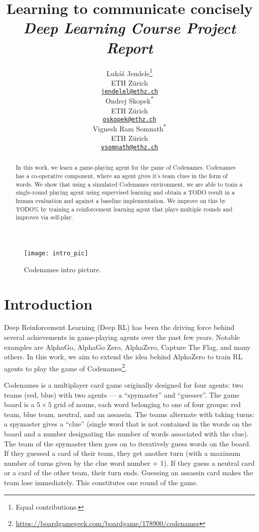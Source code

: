 \documentclass{article}
\title{Learning to communicate concisely\\{\large \textit{Deep Learning Course Project Report}}}
\author{
  Luk\'{a}\v{s} Jendele\thanks{Equal contributions.}\\
  ETH Z\"{u}rich\\
  \href{mailto:jendelel@ethz.ch}{\texttt{jendelel@ethz.ch}}\\
  \And
  Ondrej Skopek\textsuperscript{$\ast$}\\
  ETH Z\"{u}rich\\
  \href{mailto:oskopek@ethz.ch}{\texttt{oskopek@ethz.ch}}\\
  \And
  Vignesh Ram Somnath\textsuperscript{$\ast$}\\
  ETH Z\"{u}rich\\
  \href{mailto:vsomnath@ethz.ch}{\texttt{vsomnath@ethz.ch}}
}
\begin{document}
\maketitle

\begin{figure}[!h]
    \centering
    \texttt{[image: intro\_pic]}
    \caption{Codenames intro picture.}\label{fig:intro}
\end{figure}

\begin{abstract}
In this work, we learn a game-playing agent for the game of Codenames. Codenames has a co-operative component, where an agent gives it's team clues in the form of words. We show that using a simulated Codenames environment, we are able to train a single-round playing agent using supervised learning and obtain a TODO result in a human evaluation and against a baseline implementation. We improve on this by TODO\% by training a reinforcement learning agent that plays multiple rounds and improves via self-play.
\end{abstract}

\section{Introduction}

Deep Reinforcement Learning (Deep RL) has been the driving force behind several achievements in game-playing agents over the past few years. Notable examples are AlphaGo\cite{alphago}, AlphaGo Zero\cite{alphagozero}, AlphaZero\cite{alphazero}, Capture The Flag\cite{ctf}, and many others. In this work, we aim to extend the idea behind AlphaZero to train RL agents to play the game of Codenames\footnote{\url{https://boardgamegeek.com/boardgame/178900/codenames}}.

Codenames is a multiplayer card game originally designed for four agents: two teams (red, blue) with two agents --- a ``spymaster'' and ``guesser''. The game board is a $5 \times 5$ grid of nouns, each word belonging to one of four groups: red team, blue team, neutral, and an assassin. The teams alternate with taking turns: a spymaster gives a ``clue'' (single word that is not contained in the words on the board and a number designating the number of words associated with the clue). The team of the spymaster then goes on to iteratively guess words on the board. If they guessed a card of their team, they get another turn (with a maximum number of turns given by the clue word number + 1). If they guess a neutral card or a card of the other team, their turn ends. Guessing an assassin card makes the team lose immediately. This constitutes one round of the game.
\end{document}
